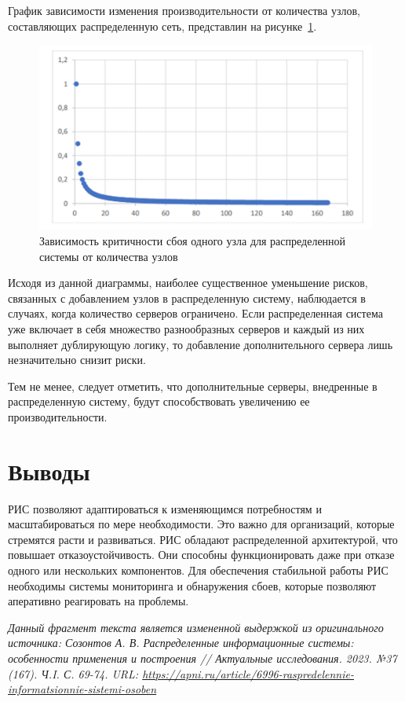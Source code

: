 \documentclass[report, draught]{fefudoc}
\begin{document}
График зависимости изменения производительности от количества узлов, составляющих распределенную сеть, представлин на рисунке~\ref{fig_scalability}.

\begin{figure}
\centering
\includegraphics[width=\textwidth]{2}
\caption{Зависимость критичности сбоя одного узла для распределенной системы от количества узлов}
\label{fig_scalability}
\end{figure}

Исходя из данной диаграммы, наиболее существенное уменьшение рисков, связанных с добавлением узлов в распределенную систему, наблюдается в случаях, когда количество серверов ограничено. Если распределенная система уже включает в себя множество разнообразных серверов и каждый из них выполняет дублирующую логику, то добавление дополнительного сервера лишь незначительно снизит риски.

Тем не менее, следует отметить, что дополнительные серверы, внедренные в распределенную систему, будут способствовать увеличению ее производительности.

\section*{Выводы}
РИС позволяют адаптироваться к изменяющимся потребностям и масштабироваться по мере необходимости. Это важно для организаций, которые стремятся расти и развиваться. РИС обладают распределенной архитектурой, что повышает отказоустойчивость. Они способны функционировать даже при отказе одного или нескольких компонентов. Для обеспечения стабильной работы РИС необходимы системы мониторинга и обнаружения сбоев, которые позволяют аперативно реагировать на проблемы.

\itshape Данный фрагмент текста является измененной выдержкой из оригинального источника: Созонтов А. В. Распределенные информационные системы: особенности применения и построения // Актуальные исследования. 2023. №37 (167). Ч.I.  С. 69-74. URL: \url{https://apni.ru/article/6996-raspredelennie-informatsionnie-sistemi-osoben}
\normalfont
\end{document}
